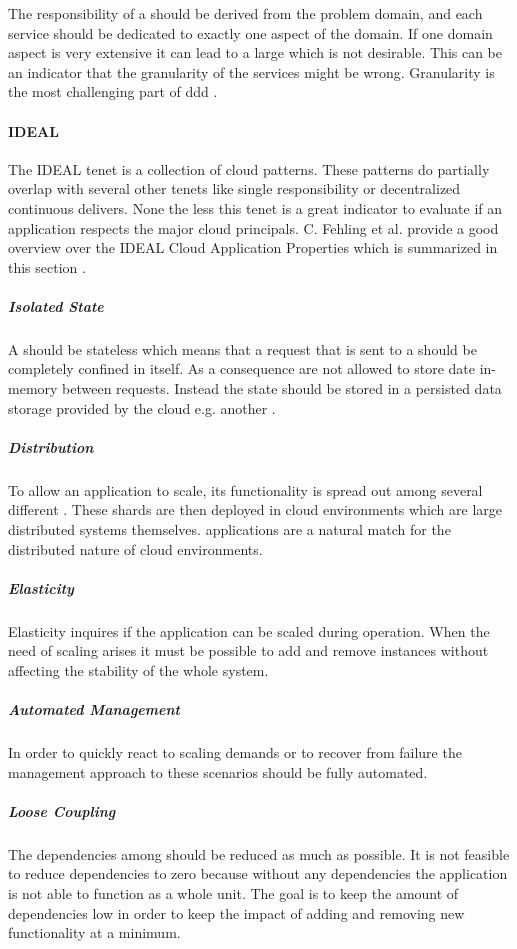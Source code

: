 The responsibility of a \ms{} should be derived from the problem domain, and
each service should be dedicated to exactly one aspect of the domain. If one
domain aspect is very extensive it can lead to a large \ms{} which is not
desirable. This can be an indicator that the granularity of the services might
be wrong. Granularity is the most challenging part of \gls{ddd}
\cite{millett2015patterns}.

\paragraph{IDEAL}

The IDEAL tenet is a collection of cloud patterns. These patterns do partially
overlap with several other tenets like single responsibility or decentralized
continuous delivers. None the less this tenet is a great indicator to
evaluate if an application respects the major cloud principals. C. Fehling et
al. provide a good overview over the  IDEAL Cloud Application Properties
which is summarized in this section \cite{fehling2015cloud}.

\subparagraph{Isolated State}
A \ms{} should be stateless which means that a request that is sent to a \ms{}
should be completely confined in itself. As a consequence \mss{} are not allowed
to store date in-memory between requests. Instead the state should be stored in
a persisted data storage provided by the cloud e.g. another \ms{}.

\subparagraph{Distribution}
To allow an application to scale, its functionality is spread out among several
different \mss{}. These shards are then deployed in cloud environments which are
large distributed systems themselves. \ms{} applications are a natural match for
the distributed nature of cloud environments.

\subparagraph{Elasticity}
Elasticity inquires if the application can be scaled during operation. When
the need of scaling arises it must be possible to add and remove \ms{} instances
without affecting the stability of the whole system.

\subparagraph{Automated Management}
In order to quickly react to scaling demands or to recover from failure the
management approach to these scenarios should be fully automated.

\subparagraph{Loose Coupling}

The dependencies among \mss{} should be reduced as much as possible. It is not
feasible to reduce dependencies to zero because without any dependencies the
application is not able to function as a whole unit. The goal is to keep the
amount of dependencies low in order to keep the impact of adding and removing
new functionality at a minimum.

